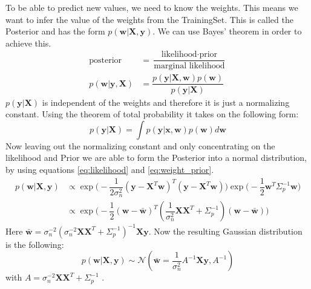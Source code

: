 To be able to predict new values, we need to know the weights. This means we want to infer the value of the weights from the \gls{TrainingSet}. This is called the \gls{Posterior} and has the form $p(\mathbf{w}|\mathbf{X},\mathbf{y})$. We can use Bayes' theorem in order to achieve this.
\begin{equation}\label{eq:bayestheorem}
\begin{aligned}
\text{posterior} &= \dfrac{\text{likelihood} \cdot \text{prior}}{\text{marginal likelihood}}\\
p(\mathbf{w}|\mathbf{y},\mathbf{X}) &= \dfrac{p(\mathbf{y}|\mathbf{X},\mathbf{w})p(\mathbf{w})}{p(\mathbf{y}|\mathbf{X})}
\end{aligned}
\end{equation}
$p(\mathbf{y}|\mathbf{X})$ is independent of the weights and therefore it is just a normalizing constant. Using the theorem of total probability it takes on the following form:
\begin{equation}\label{eq:nc_tp}
p(\mathbf{y}|\mathbf{X}) = \int p(\mathbf{y}|\mathbf{x},\mathbf{w})p(\mathbf{w})d\mathbf{w}
\end{equation}
Now leaving out the normalizing constant and only concentrating on the likelihood and \gls{Prior} we are able to form the \gls{Posterior} into a normal distribution, by using equations \ref{eq:likelihood} and \ref{eq:weight_prior}.
\begin{equation}\label{eq:posterior_distri}
\begin{aligned}
p(\mathbf{w}|\mathbf{X},\mathbf{y}) &\propto \exp\big(-\dfrac{1}{2\sigma_n^2}(\mathbf{y}-\mathbf{X}^T\mathbf{w})^T(\mathbf{y}-\mathbf{X}^T\mathbf{w})\big)\exp \big(-\dfrac{1}{2}\mathbf{w}^T\Sigma_p^{-1}\mathbf{w}\big)\\
&\propto \exp \big(-\dfrac{1}{2}(\mathbf{w}-\bar{\mathbf{w}})^T(\dfrac{1}{\sigma_n^2}\mathbf{X}\mathbf{X}^T+\Sigma_p^{-1})(\mathbf{w}-\bar{\mathbf{w}})\big)
\end{aligned}
\end{equation}
Here $\bar{\mathbf{w}} = \sigma_n^{-2}(\sigma_n^{-2}\mathbf{X}\mathbf{X}^T+\Sigma_p^{-1})^{-1}\mathbf{X}\mathbf{y}$. Now the resulting Gaussian distribution is the following:
\begin{equation}\label{eq:posterior_gauss}
p(\mathbf{w}|\mathbf{X},\mathbf{y}) \sim \mathcal{N}(\bar{\mathbf{w}}=\dfrac{1}{\sigma_n^2}A^{-1}\mathbf{X}\mathbf{y},A^{-1})
\end{equation}
with $A = \sigma_n^{-2}\mathbf{X}\mathbf{X}^T + \Sigma_p^{-1}$ \citep[p.\ 9]{Rasmussen:2005:GPM:1162254}.

